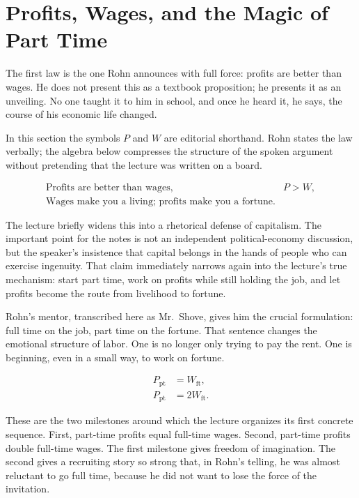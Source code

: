 \section{Profits, Wages, and the Magic of Part Time}

The first law is the one Rohn announces with full force: profits are better than wages. He does not present this as a textbook proposition; he presents it as an unveiling. No one taught it to him in school, and once he heard it, he says, the course of his economic life changed.

\begin{remark}
In this section the symbols \(P\) and \(W\) are editorial shorthand. Rohn states the law verbally; the algebra below compresses the structure of the spoken argument without pretending that the lecture was written on a board.
\end{remark}

\begin{align}
\text{Profits are better than wages,} \qquad & P > W, \\
\text{Wages make you a living; profits make you a fortune.} \nonumber
\end{align}

The lecture briefly widens this into a rhetorical defense of capitalism. The important point for the notes is not an independent political-economy discussion, but the speaker's insistence that capital belongs in the hands of people who can exercise ingenuity. That claim immediately narrows again into the lecture's true mechanism: start part time, work on profits while still holding the job, and let profits become the route from livelihood to fortune.

Rohn's mentor, transcribed here as Mr.~Shove, gives him the crucial formulation: full time on the job, part time on the fortune. That sentence changes the emotional structure of labor. One is no longer only trying to pay the rent. One is beginning, even in a small way, to work on fortune.

\begin{align}
P_{\mathrm{pt}} &= W_{\mathrm{ft}}, \\
P_{\mathrm{pt}} &= 2W_{\mathrm{ft}}.
\end{align}

These are the two milestones around which the lecture organizes its first concrete sequence. First, part-time profits equal full-time wages. Second, part-time profits double full-time wages. The first milestone gives freedom of imagination. The second gives a recruiting story so strong that, in Rohn's telling, he was almost reluctant to go full time, because he did not want to lose the force of the invitation.

